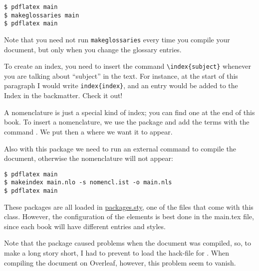 \begin{lstlisting}[style=kaolstplain]
$ pdflatex main
$ makeglossaries main
$ pdflatex main
\end{lstlisting}

Note that you need not run \texttt{makeglossaries} every time you 
compile your document, but only when you change the glossary entries.

To create an index, you need to insert the command 
\lstinline|\index{subject}| whenever you are talking about 
\enquote{subject} in the text. For instance, at the start of this 
paragraph I would write \lstinline|index{index}|, and an entry would be 
added to the Index in the backmatter. Check it out!


A nomenclature is just a special kind of index; you can find one at the end of
this book. To insert a nomenclature, we use the package  and
add the terms with the command . We put then a
 where we want it to appear.

Also with this package we need to run an external command to compile the 
document, otherwise the nomenclature will not appear:

\begin{lstlisting}[style=kaolstplain]
$ pdflatex main
$ makeindex main.nlo -s nomencl.ist -o main.nls
$ pdflatex main
\end{lstlisting}

These packages are all loaded in 
\href{style/packages.sty}{packages.sty}, one of the files that come with 
this class. However, the configuration of the elements is best done in 
the main.tex file, since each book will have different entries and 
styles.

Note that the  package caused problems when the 
document was compiled, so, to make a long story short, I had to prevent 
 to load the hack-file for . When 
compiling the document on Overleaf, however, this problem seem to 
vanish.


